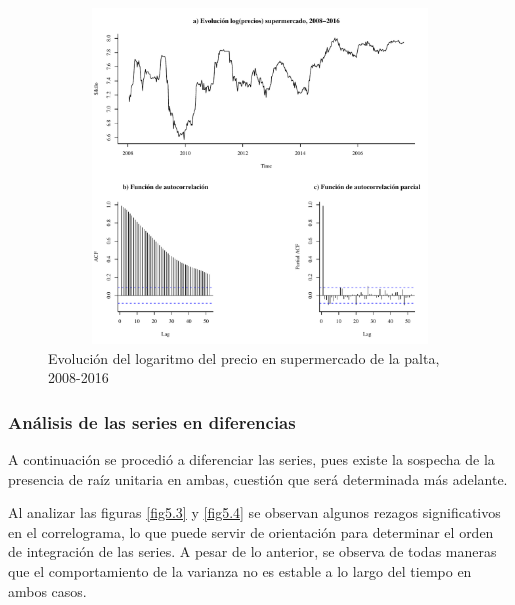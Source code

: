 \documentclass[12pt, twoside]{book}\usepackage[]{graphicx}\usepackage[]{color}
\newenvironment{knitrout}{}{} %
\numberwithin{equation}{section}
\numberwithin{theorem}{section}
\numberwithin{teorema}{section}
\numberwithin{defi}{section}
\numberwithin{prop}{section}
\numberwithin{defi}{section}
\theoremstyle{plain}
\begin{document}
\begin{knitrout}
\color{fgcolor}\begin{figure}[H]

{\centering \includegraphics[width=4.5in,height=3.5in]{figure/fig-2_2-1} 

}

\caption{Evolución del logaritmo del precio en supermercado de la palta, 2008-2016\label{fig5.2}}\label{fig:fig-2.2}
\end{figure}


\end{knitrout}

\subsubsection{Análisis de las series en diferencias}

A continuación se procedió a diferenciar las series, pues existe la sospecha de la presencia de raíz unitaria en ambas, cuestión que será determinada más adelante.

Al analizar las figuras \ref{fig5.3} y \ref{fig5.4} se observan algunos rezagos significativos en el correlograma, lo que puede servir de orientación para determinar el orden de integración de las series. A pesar de lo anterior, se observa de todas maneras que el comportamiento de la varianza no es estable a lo largo del tiempo en ambos casos.  
\end{document}
